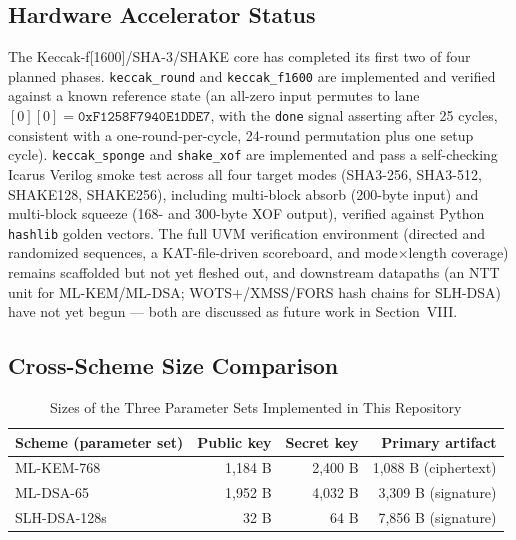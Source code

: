 \documentclass[10pt,conference]{IEEEtran}
\begin{document}
\subsection{Hardware Accelerator Status}

The Keccak-f[1600]/SHA-3/SHAKE core has completed its first two of four
planned phases. \texttt{keccak\_round} and \texttt{keccak\_f1600} are
implemented and verified against a known reference state (an all-zero
input permutes to lane $[0][0] = \mathtt{0xF1258F7940E1DDE7}$, with the
\texttt{done} signal asserting after 25 cycles, consistent with a
one-round-per-cycle, 24-round permutation plus one setup cycle).
\texttt{keccak\_sponge} and \texttt{shake\_xof} are implemented and pass
a self-checking Icarus Verilog smoke test across all four target modes
(SHA3-256, SHA3-512, SHAKE128, SHAKE256), including multi-block absorb
(200-byte input) and multi-block squeeze (168- and 300-byte XOF output),
verified against Python \texttt{hashlib} golden vectors. The full UVM
verification environment (directed and randomized sequences, a KAT-file-driven
scoreboard, and mode$\times$length coverage) remains scaffolded but not
yet fleshed out, and downstream datapaths (an NTT unit for ML-KEM/ML-DSA;
WOTS+/XMSS/FORS hash chains for SLH-DSA) have not yet begun --- both are
discussed as future work in Section~VIII.

\subsection{Cross-Scheme Size Comparison}

\begin{table}[!t]
\caption{Sizes of the Three Parameter Sets Implemented in This Repository}
\label{tab:headline}
\centering
\begin{tabular}{lrrr}
\toprule
Scheme (parameter set) & Public key & Secret key & Primary artifact \\
\midrule
ML-KEM-768  & 1{,}184 B & 2{,}400 B & 1{,}088 B (ciphertext) \\
ML-DSA-65   & 1{,}952 B & 4{,}032 B & 3{,}309 B (signature) \\
SLH-DSA-128s&    32 B &    64 B & 7{,}856 B (signature) \\
\bottomrule
\end{tabular}
\end{table}
\end{document}
